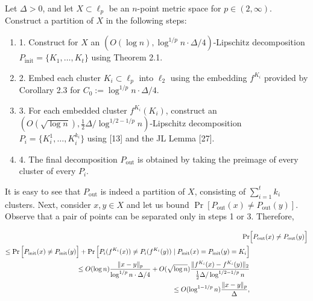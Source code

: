 Let $\Delta>0$, and let $X\subset\ell_{p}$ be an $n$-point metric space for $p\in(2,\infty)$. Construct a partition of $X$ in the following steps:
\par
\begin{enumerate}
\item[]  1. 
Construct for $X$ an $(O(\log{n}),\log^{1/p}{n}\cdot\Delta/4)$-Lipschitz decomposition $P_{\text{init}}=\{K_{1},\ldots,K_{t}\}$ using Theorem 2.1.
\par
\par
\item[]  2. 
Embed each cluster $K_{i}\subset\ell_{p}$ into $\ell_{2}$ using the embedding $f^{K_{i}}$ provided by Corollary 2.3 for $C_{0}:=\log^{1/p}{n}\cdot\Delta/4$.
\par
\par
\item[]  3. 
For each embedded cluster $f^{K_{i}}(K_{i})$, construct an $(O(\sqrt{\log{n}}),\frac{1}{2}\Delta/\log^{1/2-1/p}n)$-Lipschitz decomposition $P_{i}=\{K_{i}^{1},\ldots,K_{i}^{k_{i}}\}$ using [13] and the JL Lemma [27].
\par
\par
\item[]  4. 
The final decomposition $P_{\text{out}}$ is obtained by taking the preimage of every cluster of every $P_{i}$.
\par
\par
\end{enumerate}
\par
It is easy to see that $P_{\text{out}}$ is indeed a partition of $X$, consisting of $\sum_{i=1}^{t}k_{i}$ clusters. Next, consider $x,y\in X$ and let us bound $\Pr[P_{\text{out}}(x)\neq P_{\text{out}}(y)]$. Observe that a pair of points can be separated only in steps 1 or 3. Therefore,
\par
\[\begin{aligned}
\displaystyle\Pr & \displaystyle\Big{[}P_{\text{out}}(x)\neq P_{\text{out}}(y)\Big{]} \\
\displaystyle\leq\Pr\Big{[}P_{\text{init}}(x)\neq P_{\text{init}}(y)\Big{]}+%
\Pr\Big{[}P_{i}(f^{K_{i}}(x))\neq P_{i}(f^{K_{i}}(y))\mid P_{\text{init}}(x)=P%
_{\text{init}}(y)=K_{i}\Big{]} \\
\displaystyle\leq O(\log{n})\frac{\|x-y\|_{p}}{\log^{1/p}{n}\cdot\Delta/4}+O(%
\sqrt{\log{n}})\frac{\|f^{K_{i}}(x)-f^{K_{i}}(y)\|_{2}}{\frac{1}{2}\Delta/\log%
^{1/2-1/p}n} \\
\displaystyle\leq O(\log^{1-1/p}{n})\frac{\|x-y\|_{p}}{\Delta},
\end{aligned}\]
